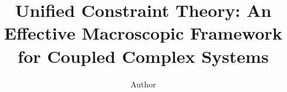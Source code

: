 ﻿\documentclass[aps,pre,reprint,superscriptaddress,nofootinbib]{revtex4-2}
\begin{document}
\title{Unified Constraint Theory: An Effective Macroscopic Framework for Coupled Complex Systems}
\author{Author}
\begin{abstract}
\end{abstract}
\maketitle
















\end{document}
